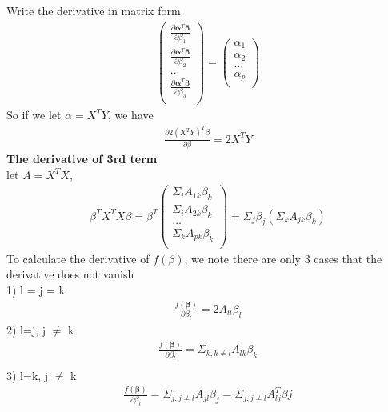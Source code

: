 \documentclass[a4paper]{article}
\begin{document}
Write the derivative in matrix form
\begin{align*}
\left(  \begin{array} {c}
		\frac{\partial{\boldsymbol{\alpha}^T\boldsymbol{\beta}}}{\partial \beta_1}\\
		\frac{\partial{\boldsymbol{\alpha}^T \boldsymbol{\beta}}}{\partial \beta_2}\\
                  ...\\
		\frac{\partial{\boldsymbol{\alpha}^T \boldsymbol{\beta}}}{\partial \beta_3}\\
		\end{array}
		\right) 
=\left(  \begin{array} {c}
		\alpha_1\\
		\alpha_2\\
                  ...\\
		\alpha_p\\
		\end{array}
		\right) 
\end{align*}
So if we let $\alpha= X^TY$, we have
\begin{align*}
\frac{\partial{2(X^TY)^T\beta}}{\partial \beta} = 2X^TY
\end{align*}
{\bf The derivative of 3rd term}\\
let $A=X^TX$,
\begin{align*}
\beta^TX^T X \beta = \beta^T
\left(  \begin{array} {c}
		\Sigma_i A_{1k}\beta_{k}\\
		 \Sigma_i A_{2k}\beta_{k}\\
                  ...\\
		 \Sigma_k A_{pk}\beta_{k}\\
		\end{array}
		\right) 
 =  \Sigma_j \beta_j (\Sigma_k A_{jk}\beta_k)
\end{align*}
To calculate the derivative of $f(\beta)$, we note there are only 3 cases that the derivative does not vanish\\
1) l = j = k 
\begin{align*}
\frac{f(\boldsymbol \beta)}{\partial \beta_l} 
= 2 A_{ll} \beta_l 
\end{align*}
2) l=j, j $\neq$ k
\begin{align*}
\frac{f(\boldsymbol \beta)}{\partial \beta_l} 
= \Sigma_{k, k\neq l} A_{lk}\beta_{k}\\
\end{align*}
3) l=k, j $\neq$ k
\begin{align*}
\frac{f(\boldsymbol \beta)}{\partial \beta_l} 
= \Sigma_{j, j\neq l} A_{jl}\beta_{j} = \Sigma_{j,  j\neq l} A^T_{lj}\beta{j}
\end{align*}
\end{document}
